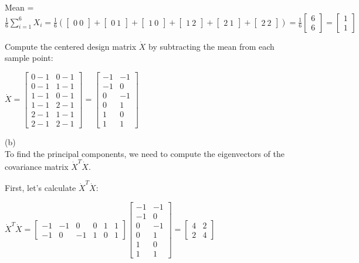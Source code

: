 Mean = $\frac{1}{6}\sum_{i=1}^{6}X_i = \frac{1}{6}\left(\begin{bmatrix} 0 \ 0 \end{bmatrix} + \begin{bmatrix} 0 \ 1 \end{bmatrix} + \begin{bmatrix} 1 \ 0 \end{bmatrix} + \begin{bmatrix} 1 \ 2 \end{bmatrix} + \begin{bmatrix} 2 \ 1 \end{bmatrix} + \begin{bmatrix} 2 \ 2 \end{bmatrix}\right) = \frac{1}{6}\begin{bmatrix} 6 \\ 6 \end{bmatrix} = \begin{bmatrix} 1 \\ 1 \end{bmatrix}$

Compute the centered design matrix $\dot{X}$ by subtracting the mean from each sample point:

$\dot{X} = \begin{bmatrix} 0-1 & 0-1 \\ 0-1 & 1-1 \\ 1-1 & 0-1 \\ 1-1 & 2-1 \\ 2-1 & 1-1 \\ 2-1 & 2-1 \end{bmatrix} = \begin{bmatrix} -1 & -1 \\ -1 & 0 \\ 0 & -1 \\ 0 & 1 \\ 1 & 0 \\ 1 & 1 \end{bmatrix}$

(b) \\
To find the principal components, we need to compute the eigenvectors of the covariance matrix $\dot{X}^T\dot{X}$.

First, let's calculate $\dot{X}^T\dot{X}$:

$\dot{X}^T\dot{X} = \begin{bmatrix} -1 & -1 & 0 & 0 & 1 & 1 \\ -1 & 0 & -1 & 1 & 0 & 1 \end{bmatrix} \begin{bmatrix} -1 & -1 \\ -1 & 0 \\ 0 & -1 \\ 0 & 1 \\ 1 & 0 \\ 1 & 1 \end{bmatrix} = \begin{bmatrix} 4 & 2 \\ 2 & 4 \end{bmatrix}$

